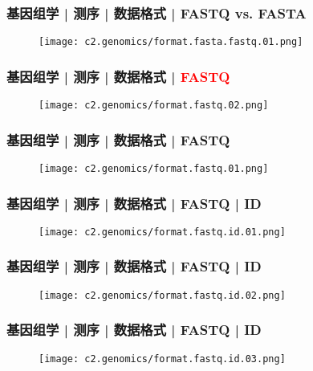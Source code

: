 \begin{frame}
  \frametitle{基因组学 | 测序 | 数据格式 | FASTQ vs. FASTA}
  \begin{figure}
    \centering
    \texttt{[image: c2.genomics/format.fasta.fastq.01.png]}
  \end{figure}
\end{frame}

\begin{frame}
  \frametitle{基因组学 | 测序 | 数据格式 | \textcolor{red}{FASTQ}}
  \begin{figure}
    \centering
    \texttt{[image: c2.genomics/format.fastq.02.png]}
  \end{figure}
\end{frame}
    
\begin{frame}
  \frametitle{基因组学 | 测序 | 数据格式 | FASTQ}
  \begin{figure}
    \centering
    \texttt{[image: c2.genomics/format.fastq.01.png]}
  \end{figure}
\end{frame}
    
\begin{frame}
  \frametitle{基因组学 | 测序 | 数据格式 | FASTQ | ID}
  \begin{figure}
    \centering
    \texttt{[image: c2.genomics/format.fastq.id.01.png]}
  \end{figure}
\end{frame}
    
\begin{frame}
  \frametitle{基因组学 | 测序 | 数据格式 | FASTQ | ID}
  \begin{figure}
    \centering
    \texttt{[image: c2.genomics/format.fastq.id.02.png]}
  \end{figure}
\end{frame}
    
\begin{frame}
  \frametitle{基因组学 | 测序 | 数据格式 | FASTQ | ID}
  \begin{figure}
    \centering
    \texttt{[image: c2.genomics/format.fastq.id.03.png]}
  \end{figure}
\end{frame}
    
